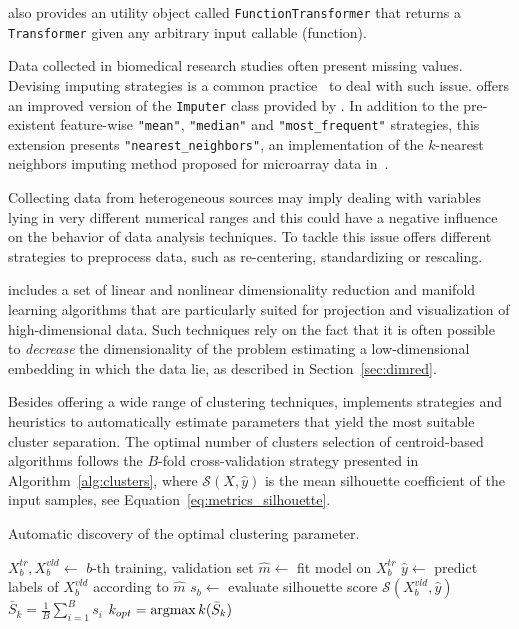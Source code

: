 \sklearn also provides an utility object called {\tt FunctionTransformer} that returns a {\tt Transformer} given any arbitrary input callable (\ie function).

Data collected in biomedical research studies often present missing values.
Devising imputing strategies is a common practice~\cite{de2015impact} to deal with such issue.
\ade offers an improved version of the {\tt Imputer} class provided by \sklearn. In addition to the pre-existent feature-wise {\color{string} {\tt "mean"}}, {\color{string} {\tt "median"}} and {\color{string} {\tt "most\_frequent"}} strategies, this extension presents {\color{string} {\tt "nearest\_neighbors"}}, \ie an implementation of the $k$-nearest neighbors imputing method proposed for microarray data in~\cite{troyanskaya2001missing}.

Collecting data from heterogeneous sources may imply dealing with variables lying in very different numerical ranges and this could have a negative influence on the behavior of data analysis techniques. To tackle this issue \ade offers different strategies to preprocess data, such as re-centering, standardizing or rescaling.

\ade includes a set of linear and nonlinear dimensionality reduction and manifold learning algorithms that are particularly suited for projection and visualization of high-dimensional data. Such techniques rely on the fact that it is often possible to \emph{decrease} the dimensionality of the problem estimating a low-dimensional embedding in which the data lie, as described in Section~\ref{sec:dimred}.

Besides offering a wide range of clustering techniques,
\ade implements strategies and heuristics to automatically estimate parameters that yield the most suitable cluster separation.
The optimal number of clusters selection of centroid-based algorithms follows the $B$-fold cross-validation strategy presented in Algorithm~\ref{alg:clusters}, where $\mathcal{S}(X,\hat y)$ is the mean silhouette coefficient of the input samples, see Equation~\eqref{eq:metrics_silhouette}.

\begin{algorithm}[]
  \caption{Automatic discovery of the optimal clustering parameter.}\label{alg:clusters}
    \begin{algorithmic}[1]
              \State $X^{tr}_b,X^{vld}_b\leftarrow$ $b$-th training, validation set
              \State $\hat{m}\leftarrow$ fit model on $X^{tr}_b$
              \State $\hat{y}\leftarrow$ predict labels of $X^{vld}_b$ according to $\hat{m}$
              \State $s_b\leftarrow$ evaluate silhouette score  $\mathcal{S}(X^{vld}_b,\hat{y})$
        \EndFor
        \State $\bar{S}_k = \frac{1}{B}\sum_{i=1}^B s_i$
        \EndFor
        \State $k_{opt} = \mathop{\mathrm{argmax}}\limits{k}(\bar{S}_k)$
    \end{algorithmic}
\end{algorithm}

